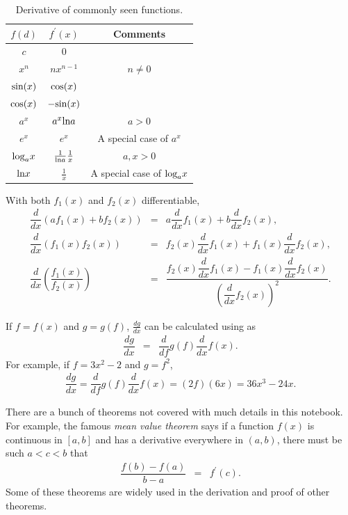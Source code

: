 \begin{table}[!htb]
\centering\caption{Derivative of commonly seen functions.} \label{chi2table:commonderivative}
\begin{tabular}{ccc}
\hline
$f(d)$ & $f^\prime(x)$ & Comments  \\ \hline
$c$ & $0$ & \\
$x^n$ & $nx^{n-1}$ & $n\neq0$ \\
$\textup{sin}(x)$ & $\textup{cos}(x)$ & \\
$\textup{cos}(x)$ & $-\textup{sin}(x)$ & \\
$a^x$ & $a^x\textup{ln}a$ & $a>0$ \\
$e^x$ & $e^x$ & A special case of $a^x$ \\
$\textup{log}_ax$ & $\frac{1}{\textup{ln}a}\frac{1}{x}$ & $a, x > 0$ \\ 
$\textup{ln}x$ & $\frac{1}{x}$ & A special case of $\textup{log}_ax$ \\
\hline
\end{tabular}
\end{table}

With both $f_1(x)$ and $f_2(x)$ differentiable,
\begin{eqnarray}
     \dfrac{d}{dx}\left(af_1(x) + bf_2(x)\right) &=& a\dfrac{d}{dx}f_1(x) + b\dfrac{d}{dx}f_2(x), \nonumber \\
     \dfrac{d}{dx}\left(f_1(x)f_2(x)\right) &=& f_2(x)\dfrac{d}{dx}f_1(x) + f_1(x)\dfrac{d}{dx}f_2(x), \nonumber \\
     \dfrac{d}{dx}\left(\dfrac{f_1(x)}{f_2(x)}\right) &=& \dfrac{ f_2(x)\dfrac{d}{dx}f_1(x) - f_1(x)\dfrac{d}{dx}f_2(x)}{\left(\dfrac{d}{dx}f_2(x)\right)^2}. \nonumber
\end{eqnarray}

If $f = f(x)$ and $g = g(f)$, $\frac{dg}{dx}$ can be calculated using  as
\begin{eqnarray}
     \dfrac{dg}{dx} &=& \dfrac{d}{df}g(f)\dfrac{d}{dx}f(x). \nonumber
\end{eqnarray}
For example, if $f = 3x^2 - 2$ and $g = f^2$,
\begin{eqnarray}
     \dfrac{dg}{dx} = \dfrac{d}{df}g(f)\dfrac{d}{dx}f(x) = \left(2f\right)\left(6x\right) = 36x^3 - 24x. \nonumber
\end{eqnarray}

There are a bunch of theorems not covered with much details in this notebook. For example, the famous \textit{mean value theorem} says if a function $f(x)$ is continuous in $[a, b]$ and has a derivative everywhere in $(a, b)$, there must be such $a < c < b$ that
\begin{eqnarray}
     \dfrac{f(b)-f(a)}{b-a} &=& f^\prime(c). \nonumber
\end{eqnarray}
Some of these theorems are widely used in the derivation and proof of other theorems.
